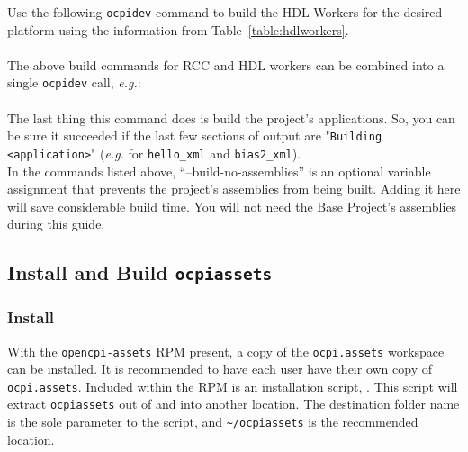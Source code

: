 Use the following \verb+ocpidev+ command to build the HDL Workers for the desired platform using the information from Table~\ref{table:hdlworkers}.\\

 \\

The above build commands for RCC and HDL workers can be combined into a single \texttt{ocpidev} call, \textit{e.g.}:\\

 \\

The last thing this command does is build the project's applications. So, you can be sure it succeeded if the last few sections of output are "\texttt{Building <application>}" (\textit{e.g.} for \texttt{hello\_xml} and \texttt{bias2\_xml}).\\

In the commands listed above, ``--build-no-assemblies'' is an optional variable assignment that prevents the project's assemblies from being built. Adding it here will save considerable build time. You will not need the Base Project's assemblies during this guide.
\begin{center}
\end{center}


\subsection{Install and Build \texttt{ocpiassets}}

\subsubsection{Install}
With the \texttt{opencpi-assets} RPM present, a copy of the \texttt{ocpi.assets} workspace can be installed. It is recommended to have each user have their own copy of \texttt{ocpi.assets}. Included within the RPM is an installation script, . This script will extract \texttt{ocpiassets} out of  and into another location. The destination folder name is the sole parameter to the script, and \verb+~/ocpiassets+ is the recommended location.\\

